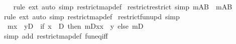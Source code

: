 \begin{isabellebody}
%
\isadelimproof
\ \ %
\endisadelimproof
%
\isatagproof
{}\isamarkupfalse%
\ {\isacharparenleft}{\kern0pt}rule\ ext{\isacharparenright}{\kern0pt}\ {\isacharparenleft}{\kern0pt}auto\ simp{\isacharcolon}{\kern0pt}\ restrict{\isacharunderscore}{\kern0pt}map{\isacharunderscore}{\kern0pt}def{\isacharparenright}{\kern0pt}%
\endisatagproof
{\isafoldproof}%
%
\isadelimproof
\isanewline
%
\endisadelimproof
\isanewline
{}\isamarkupfalse%
\ restrict{\isacharunderscore}{\kern0pt}restrict\ {\isacharbrackleft}{\kern0pt}simp{\isacharbrackright}{\kern0pt}{\isacharcolon}{\kern0pt}\ {\isachardoublequoteopen}m{\isacharbar}{\kern0pt}{\isacharbackquote}{\kern0pt}A{\isacharbar}{\kern0pt}{\isacharbackquote}{\kern0pt}B\ {\isacharequal}{\kern0pt}\ m{\isacharbar}{\kern0pt}{\isacharbackquote}{\kern0pt}{\isacharparenleft}{\kern0pt}A{\isasyminter}B{\isacharparenright}{\kern0pt}{\isachardoublequoteclose}\isanewline
%
\isadelimproof
\ \ %
\endisadelimproof
%
\isatagproof
{}\isamarkupfalse%
\ {\isacharparenleft}{\kern0pt}rule\ ext{\isacharparenright}{\kern0pt}\ {\isacharparenleft}{\kern0pt}auto\ simp{\isacharcolon}{\kern0pt}\ restrict{\isacharunderscore}{\kern0pt}map{\isacharunderscore}{\kern0pt}def{\isacharparenright}{\kern0pt}%
\endisatagproof
{\isafoldproof}%
%
\isadelimproof
\isanewline
%
\endisadelimproof
\isanewline
{}\isamarkupfalse%
\ restrict{\isacharunderscore}{\kern0pt}fun{\isacharunderscore}{\kern0pt}upd\ {\isacharbrackleft}{\kern0pt}simp{\isacharbrackright}{\kern0pt}{\isacharcolon}{\kern0pt}\isanewline
\ \ {\isachardoublequoteopen}m{\isacharparenleft}{\kern0pt}x\ {\isacharcolon}{\kern0pt}{\isacharequal}{\kern0pt}\ y{\isacharparenright}{\kern0pt}{\isacharbar}{\kern0pt}{\isacharbackquote}{\kern0pt}D\ {\isacharequal}{\kern0pt}\ {\isacharparenleft}{\kern0pt}if\ x\ {\isasymin}\ D\ then\ {\isacharparenleft}{\kern0pt}m{\isacharbar}{\kern0pt}{\isacharbackquote}{\kern0pt}{\isacharparenleft}{\kern0pt}D{\isacharminus}{\kern0pt}{\isacharbraceleft}{\kern0pt}x{\isacharbraceright}{\kern0pt}{\isacharparenright}{\kern0pt}{\isacharparenright}{\kern0pt}{\isacharparenleft}{\kern0pt}x\ {\isacharcolon}{\kern0pt}{\isacharequal}{\kern0pt}\ y{\isacharparenright}{\kern0pt}\ else\ m{\isacharbar}{\kern0pt}{\isacharbackquote}{\kern0pt}D{\isacharparenright}{\kern0pt}{\isachardoublequoteclose}\isanewline
%
\isadelimproof
\ \ %
\endisadelimproof
%
\isatagproof
{}\isamarkupfalse%
\ {\isacharparenleft}{\kern0pt}simp\ add{\isacharcolon}{\kern0pt}\ restrict{\isacharunderscore}{\kern0pt}map{\isacharunderscore}{\kern0pt}def\ fun{\isacharunderscore}{\kern0pt}eq{\isacharunderscore}{\kern0pt}iff{\isacharparenright}{\kern0pt}%

\end{isabellebody}
